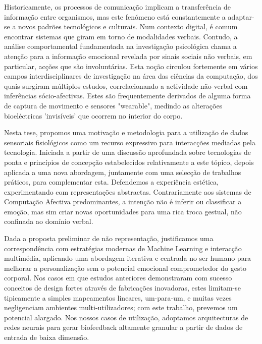 

Historicamente, os processos de comunicação implicam a transferência de informação entre organismos, mas este fenómeno está constantemente a adaptar-se a novos padrões tecnológicos e culturais. Num contexto digital, é comum encontrar sistemas que giram em torno de modalidades verbais. Contudo, a análise comportamental fundamentada na investigação psicológica chama a atenção para a informação emocional revelada por sinais sociais não verbais, em particular, acções que são involuntárias. Esta noção circulou fortemente em vários campos interdisciplinares de investigação na área das ciências da computação, dos quais surgiram múltiplos estudos, correlacionando a actividade não-verbal com inferências sócio-afectivas. Estes são frequentemente derivados de alguma forma de captura de movimento e sensores "wearable", medindo as alterações bioeléctricas 'invisíveis' que ocorrem no interior do corpo. 

Nesta tese, propomos uma motivação e metodologia para a utilização de dados sensoriais fisiológicos como um recurso expressivo para interacções mediadas pela tecnologia. Iniciada a partir de uma discussão aprofundada sobre tecnologias de ponta e princípios de concepção estabelecidos relativamente a este tópico, depois aplicada a uma nova abordagem, juntamente com uma selecção de trabalhos práticos, para complementar esta. Defendemos a experiência estética, experimentando com representações abstractas. Contrariamente aos sistemas de Computação Afectiva predominantes, a intenção não é inferir ou classificar a emoção, mas sim criar novas oportunidades para uma rica troca gestual, não confinada ao domínio verbal. 

Dada a proposta preliminar de não representação, justificamos uma correspondência com estratégias modernas de Machine Learning e interacção multimédia, aplicando uma abordagem iterativa e centrada no ser humano para melhorar a personalização sem o potencial emocional comprometedor do gesto corporal. Nos casos em que estudos anteriores demonstraram com sucesso conceitos de design fortes através de fabricações inovadoras, estes limitam-se tipicamente a simples mapeamentos lineares, um-para-um, e muitas vezes negligenciam ambientes multi-utilizadores; com este trabalho, prevemos um potencial alargado. Nos nossos casos de utilização, adoptamos arquitecturas de redes neurais para gerar biofeedback altamente granular a partir de dados de entrada de baixa dimensão.

